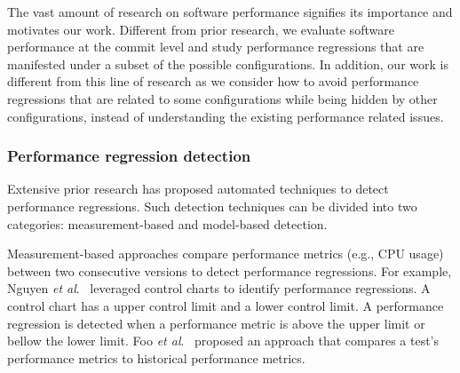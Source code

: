 The vast amount of research on software performance signifies its importance and motivates our work. %
Different from prior research, we evaluate software performance at the commit level and study performance regressions that are manifested under a subset of the possible configurations. %
In addition, our work is different from this line of research as we consider how to avoid performance regressions that are related to some configurations while being hidden by other configurations, instead of understanding the existing performance related issues. 

\subsubsection{Performance regression detection}
Extensive prior research has proposed automated techniques to detect performance regressions. Such detection techniques can be divided into two categories: measurement-based and model-based detection. 

Measurement-based approaches compare performance metrics (e.g., CPU usage) between two consecutive versions to detect performance regressions. %
For example, Nguyen \emph{et al$.$}~\cite{Nguyen:2012:ADP,nguyen2011automated,Nguyen:2014:ICS} %
leveraged control charts to identify performance regressions. %
A control chart has a upper control limit and a lower control limit. A performance regression is detected when a performance metric is above the upper limit or bellow the lower limit. Foo \emph{et al$.$}~\cite{foo2010mining} proposed an approach that compares a test's performance metrics to historical performance metrics. %

